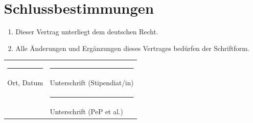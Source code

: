 \documentclass[
  paper=a4,
  fontsize=12pt,
  DIV=16,
  parskip=full,
  headinclude=true,
]{scrartcl}
\begin{document}
\newpage
\section{Schlussbestimmungen}

\begin{enumerate}[\qquad(1)]
  \item Dieser Vertrag unterliegt dem deutschen Recht.
  \item Alle Änderungen und Ergänzungen dieses Vertrages bedürfen der
    Schriftform.
\end{enumerate}

\vspace{2cm}
\begin{tabular}{@{}p{}@{}p{}@{}}%
\rule{6cm}{1pt} & \rule{7cm}{1pt} \\
Ort, Datum & Unterschrift (Stipendiat/in)\\[2cm]
 & \rule{7cm}{1pt} \\
 & Unterschrift (PeP et al.)
\end{tabular}
\end{document}
